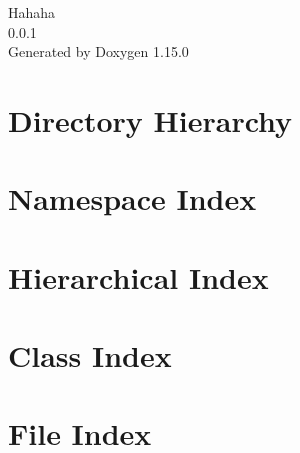 \documentclass[twoside]{book}
\newcommand{\+}{\discretionary{\mbox{\scriptsize$\hookleftarrow$}}{}{}}
\newcommand{\clearemptydoublepage}{%
    \newpage{\pagestyle{empty}\cleardoublepage}%
  }
\begin{document}
  \raggedbottom
    \hypersetup{pageanchor=false,
                bookmarksnumbered=true,
                pdfencoding=unicode
               }
  \begin{titlepage}
  \vspace*{7cm}
  \begin{center}%
  {\Large Hahaha}\\
  [1ex]\large 0.\+0.\+1 \\
  \vspace*{1cm}
  {\large Generated by Doxygen 1.15.0}\\
  \end{center}
  \end{titlepage}
  \clearemptydoublepage
  \tableofcontents
  \clearemptydoublepage
  \hypersetup{pageanchor=true}
\chapter{Directory Hierarchy}

\chapter{Namespace Index}

\chapter{Hierarchical Index}

\chapter{Class Index}

\chapter{File Index}

\end{document}
